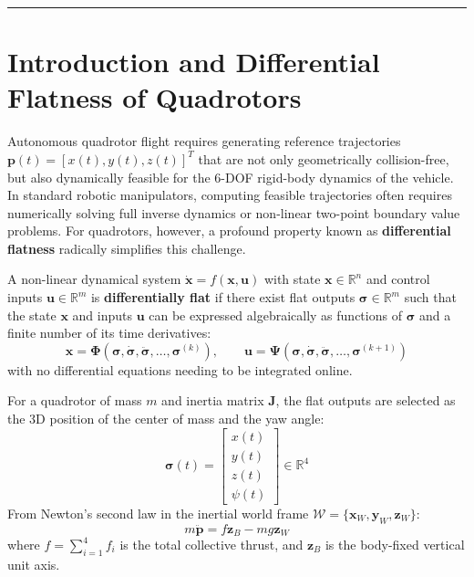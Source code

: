 \documentclass[11pt,a4paper]{article}
\begin{document}
\tableofcontents
\vspace{1.5em}
\hrule
\vspace{1.5em}

\section{Introduction and Differential Flatness of Quadrotors}

Autonomous quadrotor flight requires generating reference trajectories $\mathbf{p}(t) = [x(t), y(t), z(t)]^T$ that are not only geometrically collision-free, but also dynamically feasible for the 6-DOF rigid-body dynamics of the vehicle. In standard robotic manipulators, computing feasible trajectories often requires numerically solving full inverse dynamics or non-linear two-point boundary value problems. For quadrotors, however, a profound property known as \textbf{differential flatness} radically simplifies this challenge.

\begin{definitionbox}
A non-linear dynamical system $\dot{\mathbf{x}} = f(\mathbf{x}, \mathbf{u})$ with state $\mathbf{x} \in \mathbb{R}^n$ and control inputs $\mathbf{u} \in \mathbb{R}^m$ is \textbf{differentially flat} if there exist flat outputs $\boldsymbol{\sigma} \in \mathbb{R}^m$ such that the state $\mathbf{x}$ and inputs $\mathbf{u}$ can be expressed algebraically as functions of $\boldsymbol{\sigma}$ and a finite number of its time derivatives:
\begin{equation}
\mathbf{x} = \mathbf{\Phi}\left(\boldsymbol{\sigma}, \dot{\boldsymbol{\sigma}}, \ddot{\boldsymbol{\sigma}}, \dots, \boldsymbol{\sigma}^{(k)}\right), \qquad
\mathbf{u} = \mathbf{\Psi}\left(\boldsymbol{\sigma}, \dot{\boldsymbol{\sigma}}, \ddot{\boldsymbol{\sigma}}, \dots, \boldsymbol{\sigma}^{(k+1)}\right)
\end{equation}
with no differential equations needing to be integrated online.
\end{definitionbox}

For a quadrotor of mass $m$ and inertia matrix $\mathbf{J}$, the flat outputs are selected as the 3D position of the center of mass and the yaw angle:
\begin{equation}
\boldsymbol{\sigma}(t) = \begin{bmatrix} x(t) \\ y(t) \\ z(t) \\ \psi(t) \end{bmatrix} \in \mathbb{R}^4
\end{equation}
From Newton's second law in the inertial world frame $\mathcal{W} = \{\mathbf{x}_W, \mathbf{y}_W, \mathbf{z}_W\}$:
\begin{equation}
m \ddot{\mathbf{p}} = f \mathbf{z}_B - m g \mathbf{z}_W
\end{equation}
where $f = \sum_{i=1}^4 f_i$ is the total collective thrust, and $\mathbf{z}_B$ is the body-fixed vertical unit axis.
\end{document}
